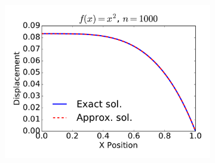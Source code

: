 \documentclass{article}
\begin{document}
\begin{figure}
\begin{subfigure}[b]{0.33\textwidth}
                \includegraphics[width=\linewidth]{displacement_func2_Nell1000}
                \label{fig:tiger}
        \end{subfigure}%
        

\end{figure}
\end{document}
